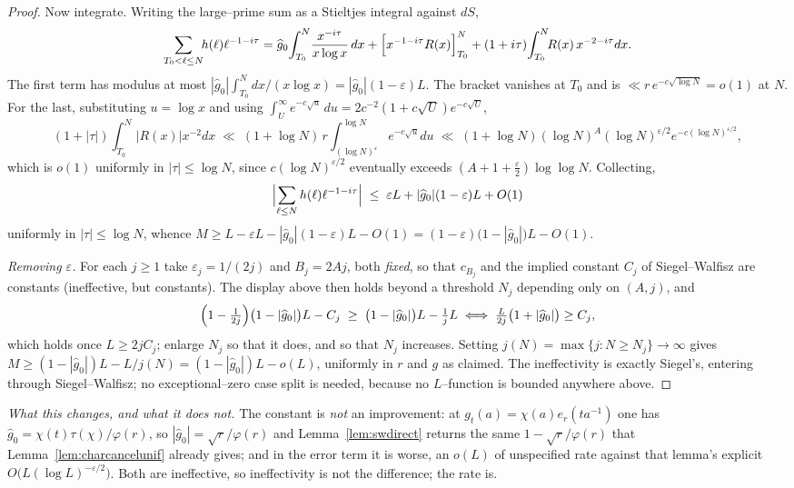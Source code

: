 \documentclass[11pt]{article}
\theoremstyle{definition}
\begin{document}
\begin{proof}
Now integrate. Writing the large--prime sum as a Stieltjes integral against $dS$,
\[ \sum_{T_0<\ell\le N}\!\!h(\ell)\ell^{-1-i\tau}
   =\widehat g_0\!\int_{T_0}^{N}\!\frac{x^{-i\tau}}{x\log x}\,dx
    +\Bigl[x^{-1-i\tau}R(x)\Bigr]_{T_0}^{N}+(1+i\tau)\!\int_{T_0}^{N}\!\!R(x)\,x^{-2-i\tau}dx. \]
The first term has modulus at most
$|\widehat g_0|\int_{T_0}^N dx/(x\log x)=|\widehat g_0|(1-\varepsilon)L$. The bracket vanishes at
$T_0$ and is $\ll r\,e^{-c\sqrt{\log N}}=o(1)$ at $N$. For the last, substituting $u=\log x$ and
using $\int_U^\infty e^{-c\sqrt u}\,du=2c^{-2}(1+c\sqrt U)e^{-c\sqrt U}$,
\[ (1+|\tau|)\!\int_{T_0}^{N}\!|R(x)|x^{-2}dx
   \;\ll\;(1+\log N)\,r\!\int_{(\log N)^{\varepsilon}}^{\log N}\!\!e^{-c\sqrt u}du
   \;\ll\;(1+\log N)(\log N)^{A}(\log N)^{\varepsilon/2}e^{-c(\log N)^{\varepsilon/2}}, \]
which is $o(1)$ uniformly in $|\tau|\le\log N$, since
$c(\log N)^{\varepsilon/2}$ eventually exceeds $(A+1+\tfrac\varepsilon2)\log\log N$. Collecting,
\[ \Bigl|\sum_{\ell\le N}h(\ell)\ell^{-1-i\tau}\Bigr|
   \;\le\;\varepsilon L+|\widehat g_0|(1-\varepsilon)L+O(1) \]
uniformly in $|\tau|\le\log N$, whence
$M\ge L-\varepsilon L-|\widehat g_0|(1-\varepsilon)L-O(1)=(1-\varepsilon)\bigl(1-|\widehat g_0|\bigr)L-O(1)$.

\emph{Removing $\varepsilon$.} For each $j\ge1$ take $\varepsilon_j=1/(2j)$ and $B_j=2Aj$, both
\emph{fixed}, so that $c_{B_j}$ and the implied constant $C_j$ of Siegel--Walfisz are constants
(ineffective, but constants). The display above then holds beyond a threshold $N_j$ depending only
on $(A,j)$, and
\[ \Bigl(1-\tfrac1{2j}\Bigr)\bigl(1-|\widehat g_0|\bigr)L-C_j
   \;\ge\;\bigl(1-|\widehat g_0|\bigr)L-\tfrac1jL
   \iff \tfrac{L}{2j}\bigl(1+|\widehat g_0|\bigr)\ge C_j, \]
which holds once $L\ge2jC_j$; enlarge $N_j$ so that it does, and so that $N_j$ increases. Setting
$j(N)=\max\{j:N\ge N_j\}\to\infty$ gives
$M\ge(1-|\widehat g_0|)L-L/j(N)=(1-|\widehat g_0|)L-o(L)$, uniformly in $r$ and $g$ as claimed.
The ineffectivity is exactly Siegel's, entering through Siegel--Walfisz; no exceptional--zero case
split is needed, because no $L$--function is bounded anywhere above.
\end{proof}

\emph{What this changes, and what it does not.} The constant is \emph{not} an improvement: at $g_t(a)=\chi(a)e_r(ta^{-1})$ one has
$\widehat g_0=\chi(t)\tau(\chi)/\varphi(r)$, so $|\widehat g_0|=\sqrt r/\varphi(r)$ and
Lemma~\ref{lem:swdirect} returns the same $1-\sqrt r/\varphi(r)$ that
Lemma~\ref{lem:charcancelunif} already gives; and in the error term it is worse, an $o(L)$ of
unspecified rate against that lemma's explicit $O\bigl(L(\log L)^{-\varepsilon/2}\bigr)$. Both are
ineffective, so ineffectivity is not the difference; the rate is.
\end{document}
